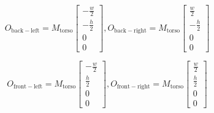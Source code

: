 \documentclass{article}
\begin{document}
    \begin{equation}
        O_{\mathrm{back-left}} = M_{\mathrm{torso}}
        \begin{bmatrix}
            - \frac{w}{2} \\
            - \frac{h}{2} \\
            0 \\
            0
        \end{bmatrix},
        O_{\mathrm{back-right}} = M_{\mathrm{torso}}
        \begin{bmatrix}
            \frac{w}{2} \\
            - \frac{h}{2} \\
            0 \\
            0
        \end{bmatrix}
    \end{equation}


    \begin{equation}
        O_{\mathrm{front-left}} = M_{\mathrm{torso}}
        \begin{bmatrix}
            - \frac{w}{2} \\
            \frac{h}{2} \\
            0 \\
            0
        \end{bmatrix},
        O_{\mathrm{front-right}} = M_{\mathrm{torso}}
        \begin{bmatrix}
            \frac{w}{2} \\
            \frac{h}{2} \\
            0 \\
            0
        \end{bmatrix}
    \end{equation}
\end{document}
